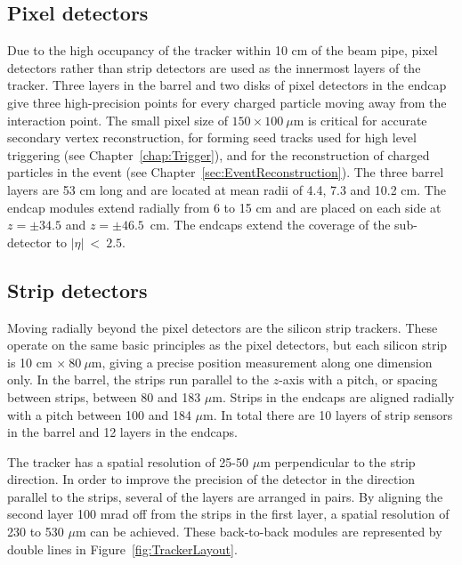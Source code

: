 \subsection{Pixel detectors}
\label{sec:TrackerPixel}

Due to the high occupancy of the tracker within 10 cm of the beam pipe, pixel detectors rather than strip detectors are used as the innermost layers of the tracker. Three layers in the barrel and two disks of pixel detectors in the endcap give three high-precision points for every charged particle moving away from the interaction point. The small pixel size of $150\times100~\mu$m is critical for accurate secondary vertex reconstruction, for forming seed tracks used for high level triggering (see Chapter~\ref{chap:Trigger}), and for the reconstruction of charged particles in the event (see Chapter~\ref{sec:EventReconstruction}). The three barrel layers are 53 cm long and are located at mean radii of 4.4, 7.3 and 10.2 cm. The endcap modules extend radially from 6 to 15 cm and are placed on each side at $z=\pm34.5$ and $z=\pm46.5$~cm. The endcaps extend the coverage of the sub-detector to $|\eta|~<~ 2.5$. 

\subsection{Strip detectors}
\label{sec:TrackStrip}
Moving radially beyond the pixel detectors are the silicon strip trackers. These operate on the same basic principles as the pixel detectors, but each silicon strip is 10 cm $\times~80~\mu$m, giving a precise position measurement along one dimension only. In the barrel, the strips run parallel to the $z$-axis with a pitch, or spacing between strips, between 80 and 183 $\mu$m. Strips in the endcaps are aligned radially with a pitch between 100 and 184 $\mu$m. In total there are 10 layers of strip sensors in the barrel and 12 layers in the endcaps.

The tracker has a spatial resolution of 25-50 $\mu$m perpendicular to the strip direction. In order to improve the precision of the detector in the direction parallel to the strips, several of the layers are arranged in pairs. By aligning the second layer 100 mrad off from the strips in the first layer, a spatial resolution of 230 to 530 $\mu$m can be achieved. These back-to-back modules are represented by double lines in Figure~\ref{fig:TrackerLayout}.

